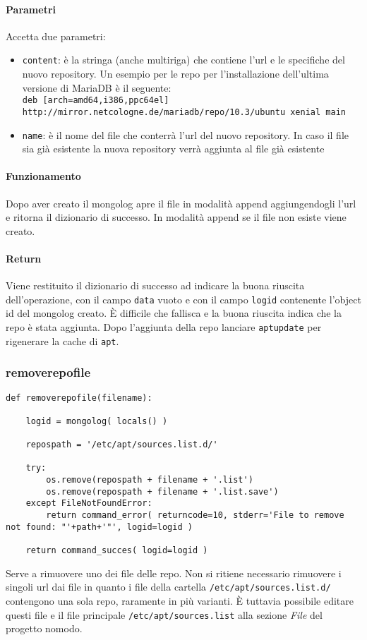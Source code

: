 \documentclass[11pt]{article}
\begin{document}
\paragraph{Parametri}
Accetta due parametri:
\begin{itemize}
	\item{\texttt{content}: è la stringa (anche multiriga) che contiene l'url e le specifiche del nuovo repository.
		Un esempio per le repo per l'installazione dell'ultima versione di MariaDB è il seguente:\\
		\texttt{deb [arch=amd64,i386,ppc64el] http://mirror.netcologne.de/mariadb/repo/10.3/ubuntu xenial main}}
	\item{\texttt{name}: è il nome del file che conterrà l'url del nuovo repository. In caso il file sia già esistente
		la nuova repository verrà aggiunta al file già esistente}
\end{itemize}
\paragraph{Funzionamento}
Dopo aver creato il mongolog apre il file in modalità append aggiungendogli l'url e ritorna il dizionario di successo.
In modalità append se il file non esiste viene creato.
\paragraph{Return}
Viene restituito il dizionario di successo ad indicare la buona riuscita dell'operazione, con il campo \texttt{data} vuoto
e con il campo \texttt{logid} contenente l'object id del mongolog creato. È difficile che fallisca e la buona riuscita indica
che la repo è stata aggiunta. Dopo l'aggiunta della repo lanciare \texttt{aptupdate} per rigenerare la cache di \texttt{apt}.

\subsubsection{removerepofile}\label{removerepofile}
\begin{lstlisting}
def removerepofile(filename):

    logid = mongolog( locals() )

    repospath = '/etc/apt/sources.list.d/'

    try:
        os.remove(repospath + filename + '.list')
        os.remove(repospath + filename + '.list.save')
    except FileNotFoundError:
        return command_error( returncode=10, stderr='File to remove not found: "'+path+'"', logid=logid )

    return command_succes( logid=logid )
\end{lstlisting}
Serve a rimuovere uno dei file delle repo. Non si ritiene necessario rimuovere i singoli url dai file in quanto i file
della cartella \texttt{/etc/apt/sources.list.d/} contengono una sola repo, raramente in più varianti. È tuttavia possibile
editare questi file e il file principale \texttt{/etc/apt/sources.list} alla sezione \textit{File} del progetto nomodo.
\end{document}
